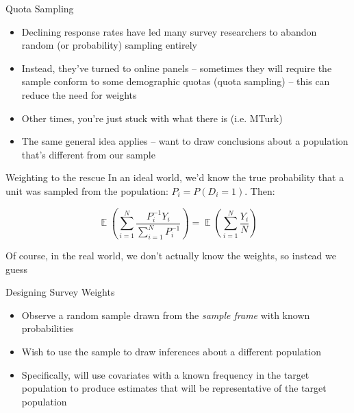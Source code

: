 \documentclass{beamer}
\DeclareMathOperator*{\E}{\mathbb{E}}
\begin{document}
\begin{frame}{Quota Sampling}
	\begin{itemize}
		\item Declining response rates have led many survey researchers to abandon random (or probability) sampling entirely \pause 
		\item Instead, they've turned to online panels -- sometimes they will require the sample conform to some demographic quotas (quota sampling) -- this can reduce the need for weights \pause 
		\item Other times, you're just stuck with what there is (i.e. MTurk) \pause 
		\item The same general idea applies -- want to draw conclusions about a population that's different from our sample
	\end{itemize}
\end{frame}


\begin{frame}{Weighting to the rescue}
In an ideal world, we'd know the true probability that a unit was sampled from the population: $P_i = P(D_i = 1)$. Then:

$$
\E\left(\sum_{i=1}^N \frac{P_i^{-1} Y_i}{\sum_{i=1}^N P_i^{-1}}\right) = \E\left(\sum_{i=1}^N \frac{Y_i}{N}\right) 
$$

Of course, in the real world, we don't actually know the weights, so instead we guess
\end{frame}


\begin{frame}{Designing Survey Weights}
	\begin{itemize} 
		\item Observe a random sample drawn from the \textit{sample frame} with known probabilities \pause 
		\item Wish to use the sample to draw inferences about a different population \pause 
		\item Specifically, will use covariates with a known frequency in the target population to produce estimates that will be representative of the target population

	\end{itemize}
\end{frame}
\end{document}
